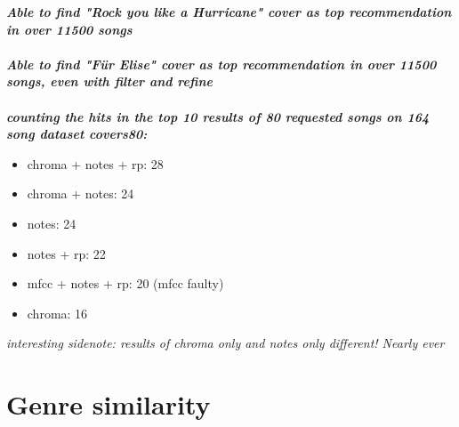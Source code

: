 \textit{\textbf{Able to find "Rock you like a Hurricane" cover as top recommendation in over 11500 songs\\}}
\ \\
\textit{\textbf{Able to find "Für Elise" cover as top recommendation in over 11500 songs, even with filter and refine\\}}
\ \\
\textit{\textbf{counting the hits in the top 10 results of 80 requested songs on 164 song dataset covers80:\\}}
\begin{itemize}
	\setlength\itemsep{-0.5em}
	\item chroma + notes + rp: 28
	\item chroma + notes: 24
	\item notes: 24
	\item notes + rp: 22
	\item mfcc + notes + rp: 20 (mfcc faulty)
	\item chroma: 16

\end{itemize}
\textit{interesting sidenote: results of chroma only and notes only different! Nearly ever}

\section{Genre similarity}\label{genrerec}

